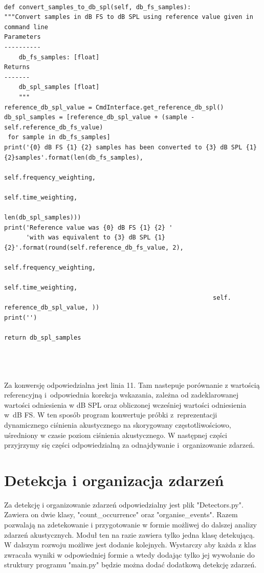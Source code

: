 \documentclass[eng,printmode]{mgr}
\begin{document}
\begin{minipage}{\linewidth}
\begin{lstlisting}[caption={fragment kodu źródłowego pliku SampleSPLConverter.py, klasa SamplesDbSPLConverter, metoda convert\_samples\_to\_db\_spl},captionpos=b,label={samplesToDbSPL}]     
      
def convert_samples_to_db_spl(self, db_fs_samples):
"""Convert samples in dB FS to dB SPL using reference value given in command line
Parameters
----------
    db_fs_samples: [float]
Returns
-------
    db_spl_samples [float]
    """
reference_db_spl_value = CmdInterface.get_reference_db_spl()
db_spl_samples = [reference_db_spl_value + (sample - self.reference_db_fs_value)
 for sample in db_fs_samples]
print('{0} dB FS {1} {2} samples has been converted to {3} dB SPL {1} {2}samples'.format(len(db_fs_samples),
                                                                   self.frequency_weighting,
                                                                   self.time_weighting,
                                                                   len(db_spl_samples)))
print('Reference value was {0} dB FS {1} {2} '
      'with was equivalent to {3} dB SPL {1} {2}'.format(round(self.reference_db_fs_value, 2),
                                                         self.frequency_weighting,
                                                         self.time_weighting,
                                                         self. reference_db_spl_value, ))
print('')

return db_spl_samples




\end{lstlisting}
\end{minipage}

Za konwersję odpowiedzialna jest linia 11. Tam nastepuje porównanie z wartością referencyjną i~odpowiednia korekcja wskazania, zależna od zadeklarowanej wartości odniesienia w dB SPL oraz obliczonej wcześniej wartości odniesienia w~dB FS.
W ten sposób program konwertuje próbki z~reprezentacji dynamicznego ciśnienia akustycznego na skorygowany częstotliwościowo, uśredniony w czasie poziom ciśnienia akustycznego. W następnej części przyjrzymy się części odpowiedzialną za odnajdywanie i~organizowanie zdarzeń.
\section{Detekcja i organizacja zdarzeń}
Za detekcję i organizowanie zdarzeń odpowiedzialny jest plik "Detectors.py". Zawiera on dwie klasy, "count\_occurrence" oraz "organise\_events". Razem pozwalają na zdetekowanie i przygotowanie w formie możliwej do dalszej analizy zdarzeń akustycznych. Moduł ten na razie zawiera tylko jedna klasę detekującą. W dalszym rozwoju możliwe jest dodanie kolejnych. Wystarczy aby każda z klas zwracała wyniki w odpowiedniej formie a wtedy dodając tylko jej wywołanie do struktury programu "main.py" będzie można dodać dodatkową detekcję zdarzeń. 
\end{document}

